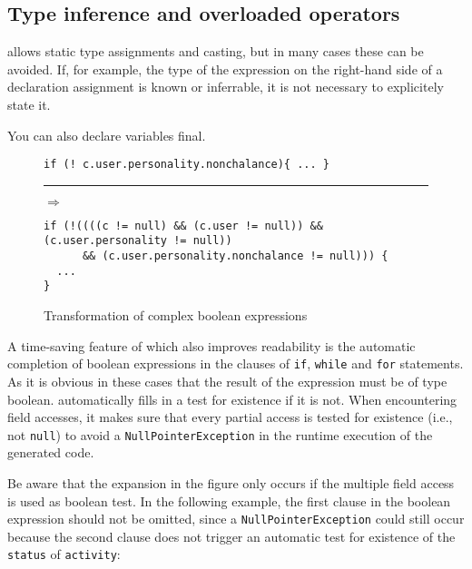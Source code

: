 \subsection{Type inference and overloaded operators}
\label{sec:typeinference}

\vonda allows static type assignments and casting, but in many cases these can
be avoided. If, for example, the type of the expression on the right-hand side
of a declaration assignment is known or inferrable, it is not necessary to
explicitely state it.

You can also declare variables final.

\begin{figure}[htbp]
  \begin{small}
\begin{minipage}{.55\textwidth}
\begin{lstlisting}
if (! c.user.personality.nonchalance){ ... }
\end{lstlisting}
\end{minipage}\rule{2cm}{0pt}{\LARGE$\Rightarrow$}\hfill\\
\begin{lstlisting}
if (!((((c != null) && (c.user != null)) && (c.user.personality != null))
      && (c.user.personality.nonchalance != null))) {
  ...
}
\end{lstlisting}\end{small}\vspace*{-2ex}
\caption{\label{tab:multi-predaccess}Transformation of complex boolean expressions}

\end{figure}
\vspace*{10pt}

A time-saving feature of \vonda which also improves readability is the
automatic completion of boolean expressions in the clauses of \texttt{if},
\texttt{while} and \texttt{for} statements. As it is obvious in these cases
that the result of the expression must be of type boolean. \vonda automatically
fills in a test for existence if it is not. When encountering field accesses,
it makes sure that every partial access is tested for existence (i.e., not
\texttt{null}) to avoid a \texttt{NullPointerException} in the runtime
execution of the generated code.

Be aware that the expansion in the figure only occurs if the multiple field
access is used as boolean test. In the following example, the first clause in
the boolean expression should not be omitted, since a
\texttt{NullPointerException} could still occur because the second clause does
not trigger an automatic test for existence of the \texttt{status} of
\texttt{activity}:


